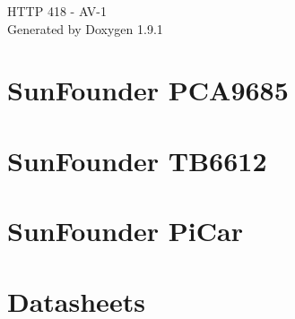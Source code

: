 \let\mypdfximage\pdfximage\def\pdfximage{\immediate\mypdfximage}\documentclass[twoside]{book}
\newcommand{\+}{\discretionary{\mbox{\scriptsize$\hookleftarrow$}}{}{}}
\newcommand{\clearemptydoublepage}{%
  \newpage{\pagestyle{empty}\cleardoublepage}%
}
\begin{document}
\raggedbottom

\hypersetup{pageanchor=false,
             bookmarksnumbered=true,
             pdfencoding=unicode
            }
\begin{titlepage}
\vspace*{7cm}
\begin{center}%
{\Large HTTP 418 -\/ AV-\/1 }\\
\vspace*{1cm}
{\large Generated by Doxygen 1.9.1}\\
\end{center}
\end{titlepage}
\clearemptydoublepage
{}
\tableofcontents
\clearemptydoublepage
{}
\hypersetup{pageanchor=true}

\chapter{Sun\+Founder PCA9685}
\label{md_src_picar__module__sun_founder__pi_car_picar__sun_founder__p_c_a9685__r_e_a_d_m_e}

\chapter{Sun\+Founder TB6612}
\label{md_src_picar__module__sun_founder__pi_car_picar__sun_founder__t_b6612__r_e_a_d_m_e}

\chapter{Sun\+Founder Pi\+Car}
\label{md_src_picar__module__sun_founder__pi_car__r_e_a_d_m_e}

\chapter{Datasheets}
\label{md_src_picar__module__sun_founder__pi_car__v_datasheet__r_e_a_d_m_e}

\end{document}
